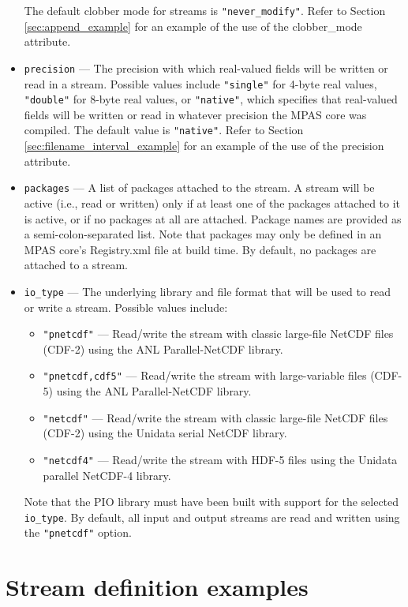 \begin{itemize}
\begin{itemize}
\end{itemize}
The default clobber mode for streams is {\tt "never\_modify"}. Refer to Section \ref{sec:append_example} for an example of the use of
the clobber\_mode attribute.
\item {\tt precision} --- The precision with which real-valued fields will be written or read in a stream. Possible values include 
{\tt "single"} for 4-byte real values, {\tt "double"} for 8-byte real values, or {\tt "native"}, which specifies that real-valued fields
will be written or read in whatever precision the MPAS core was compiled. The default value is {\tt "native"}. Refer to Section \ref{sec:filename_interval_example}
for an example of the use of the precision attribute.
\item {\tt packages} --- A list of packages attached to the stream. A stream will be active (i.e., read or written) only if at least one of 
the packages attached to it is active, or if no packages at all are attached. Package names are provided as a semi-colon-separated
list. Note that packages may only be defined in an MPAS core's Registry.xml file at build time. By default, no packages are attached
to a stream.
\item {\tt io\_type} --- The underlying library and file format that will be used to read or write a stream. Possible values include:
\begin{itemize}
\item{\tt "pnetcdf"} --- Read/write the stream with classic large-file NetCDF files (CDF-2) using the ANL Parallel-NetCDF library.
\item{\tt "pnetcdf,cdf5"} --- Read/write the stream with large-variable files (CDF-5) using the ANL Parallel-NetCDF library. 
\item{\tt "netcdf"} --- Read/write the stream with classic large-file NetCDF files (CDF-2) using the Unidata serial NetCDF library.
\item{\tt "netcdf4"} --- Read/write the stream with HDF-5 files using the Unidata parallel NetCDF-4 library.
\end{itemize}
Note that the PIO library must have been built with support for the selected {\tt io\_type}. By default, all input and output streams are
read and written using the {\tt "pnetcdf"} option.
\end{itemize}

\section{Stream definition examples}
\label{sec:stream_example} 

